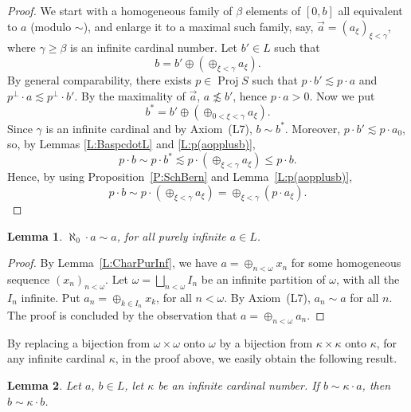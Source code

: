 \documentclass[psamsfonts,reqno]{memo-l}
\theoremstyle{plain}
\newtheorem{lemma}{Lemma}[section]
\theoremstyle{definition}
\theoremstyle{remark}
\numberwithin{equation}{section}
\DeclareMathOperator{\BB}{Proj}
\newcommand{\famm}[2]{(#1)_{#2}}
\begin{document}
\begin{proof}
We start with a homogeneous family of $\beta$ elements of $[0,b]$ all
equivalent to $a$ (modulo $\sim$), and enlarge it to a maximal such family,
say, $\vec a=\famm{a_\xi}{\xi<\gamma}$, where $\gamma\geq\beta$ is an
infinite cardinal number. Let $b'\in L$ such that
   \[
   b=b'\oplus(\oplus_{\xi<\gamma}a_\xi).
   \]
By general comparability, there exists $p\in\BB{S}$\index{pzzroj@$\BB{S}$}
such that
$p\cdot b'\lesssim p\cdot a$ and $p^\bot\cdot a\lesssim p^\bot\cdot b'$. By
the maximality of $\vec a$, $a\not\lesssim b'$, hence $p\cdot a>0$.
Now we put
   \[
   b^*=b'\oplus(\oplus_{0<\xi<\gamma}a_\xi).
   \]
Since $\gamma$ is an infinite cardinal and by Axiom~(L7), $b\sim b^*$.
Moreover, $p\cdot b'\lesssim p\cdot a_0$, so, by Lemmas
\ref{L:BaspcdotL} and \ref{L:p(aopplusb)},
   \[
   p\cdot b\sim p\cdot b^*\lesssim p\cdot(\oplus_{\xi<\gamma}a_\xi)
   \leq p\cdot b.
   \]
Hence, by using Proposition~\ref{P:SchBern} and Lemma~\ref{L:p(aopplusb)},
   \begin{equation}
   p\cdot b\sim p\cdot(\oplus_{\xi<\gamma}a_\xi)=
   \oplus_{\xi<\gamma}(p\cdot a_\xi).\tag*{\qed}
   \end{equation}
\renewcommand{\qed}{}
\end{proof}

\begin{lemma}\label{L:PurInfAl0}
$\aleph_0\cdot a\sim a$, for all purely infinite $a\in L$.
\end{lemma}

\begin{proof}
By Lemma~\ref{L:CharPurInf}, we have $a=\oplus_{n<\omega}x_n$ for some
homogeneous sequence $\famm{x_n}{n<\omega}$. Let
$\omega=\bigsqcup_{n<\omega}I_n$ be an infinite partition of $\omega$, with
all the $I_n$ infinite. Put
$a_n=\oplus_{k\in I_n}x_k$, for all $n<\omega$. By Axiom~(L7), $a_n\sim a$
for all $n$. The proof is concluded by the observation that
$a=\oplus_{n<\omega}a_n$.
\end{proof}

By replacing a bijection from $\omega\times\omega$ onto $\omega$ by a
bijection from $\kappa\times\kappa$ onto $\kappa$, for any infinite cardinal
$\kappa$, in the proof above, we easily obtain the following result.

\begin{lemma}\label{L:PurInfKappa}
Let $a$, $b\in L$, let $\kappa$ be an infinite cardinal number. If
$b\sim\kappa\cdot a$, then $b\sim\kappa\cdot b$.
\end{lemma}
\end{document}

